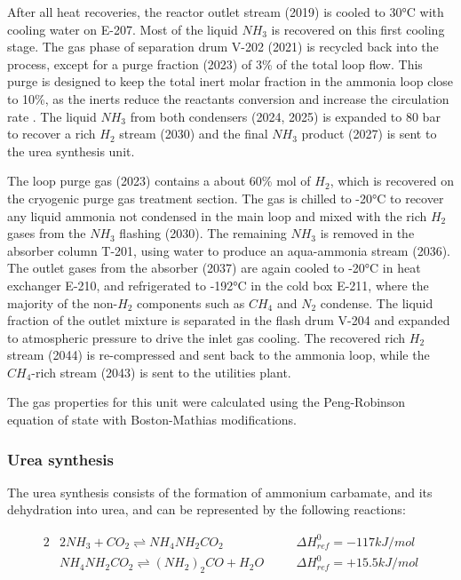 \documentclass[a4paper, titlepage]{article}
\begin{document}
After all heat recoveries, the reactor outlet stream (2019) is cooled to 30°C with cooling water on E-207. Most of the 
liquid $NH_3$ is recovered on this first cooling stage. The gas phase of separation drum V-202 (2021) is recycled back
into the process, except for a purge fraction (2023) of 3\% of the total loop flow. This purge is designed to keep the
total inert molar fraction in the ammonia loop close to 10\%, as the inerts reduce the reactants conversion and
increase the circulation rate \cite{florez-orregoProcessSynthesisOptimization2018}. 
The liquid $NH_3$ from both condensers (2024, 2025) is expanded to 80 bar to recover a rich $H_2$ stream (2030) and
the final $NH_3$ product (2027) is sent to the urea synthesis unit.

The loop purge gas (2023) contains a about 60\% mol of $H_2$, which is recovered on the cryogenic purge gas treatment 
section. The gas is chilled to -20°C to recover any liquid ammonia not condensed in the main loop and mixed with the
rich $H_2$ gases from the $NH_3$ flashing (2030). The remaining $NH_3$ is removed in the absorber column T-201, 
using water to produce an aqua-ammonia stream (2036). The outlet gases from the absorber (2037) are again cooled to
-20°C  in heat exchanger E-210, and refrigerated to -192°C in the cold box E-211, where the majority of the non-$H_2$
components such as $CH_4$ and $N_2$ condense. The liquid fraction of the outlet mixture is separated in the flash drum V-204 and expanded to atmospheric pressure to drive the inlet gas cooling. The recovered rich $H_2$ stream (2044) is re-compressed
and sent back to the ammonia loop, while the $CH_4$-rich stream (2043) is sent to the utilities plant.

The gas properties for this unit were calculated using the Peng-Robinson equation of state with Boston-Mathias
modifications.

\subsubsection{Urea synthesis}
The urea synthesis consists of the formation of ammonium carbamate, and its dehydration into urea, and can be
represented by the following reactions:

\begin{alignat}{2}
	&2NH_3 + CO_2 \rightleftharpoons NH_4NH_2CO_2 \quad & &\Delta H_{ref}^0 = -117 kJ/mol  \\
	&NH_4NH_2CO_2 \rightleftharpoons (NH_2)_2CO + H_2O \quad & &\Delta H_{ref}^0 = +15.5 kJ/mol 
\end{alignat}
\end{document}
